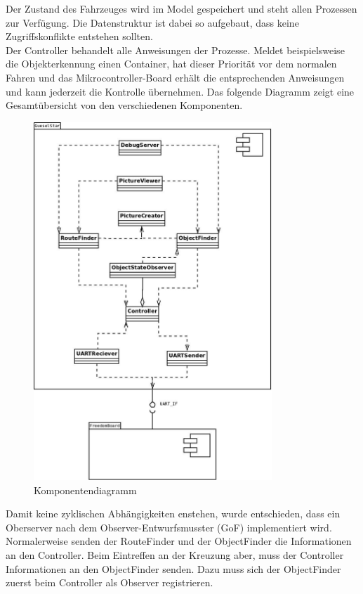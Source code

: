 Der Zustand des Fahrzeuges wird im Model gespeichert und steht allen Prozessen zur Verfügung. Die Datenstruktur ist dabei so aufgebaut, dass keine Zugriffskonflikte entstehen sollten.\\
Der Controller behandelt alle Anweisungen der Prozesse. Meldet beispielsweise die Objekterkennung einen Container, hat dieser Priorität vor dem normalen Fahren und das Mikrocontroller-Board erhält die entsprechenden Anweisungen und kann jederzeit die Kontrolle übernehmen. Das folgende Diagramm zeigt eine Gesamtübersicht von den verschiedenen Komponenten.\\[0.2cm]
\begin{figure}[H]
\centering
\includegraphics[width=0.8\textwidth]{03_Loesungskonzept/pictures/Komponentendiagramm_detailliert_v2.jpeg}
\caption{Komponentendiagramm}
\end{figure}
Damit keine zyklischen Abhängigkeiten enstehen, wurde entschieden, dass ein Oberserver nach dem Observer-Entwurfsmusster (GoF) implementiert wird. Normalerweise senden der RouteFinder und der ObjectFinder die Informationen an den Controller. Beim Eintreffen an der Kreuzung aber, muss der Controller Informationen an den ObjectFinder senden. Dazu muss sich der ObjectFinder zuerst beim Controller als Observer registrieren.

